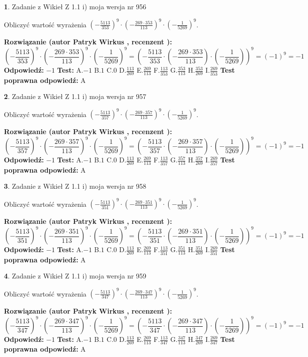 \documentclass[12pt, a4paper]{article}
\theoremstyle{definition} %
\newtheorem{zad}{}
\newcommand{\zadStart}[1]{\begin{zad}#1\newline}
\newcommand{\zadStop}{\end{zad}}
\newcommand{\rozwStart}[2]{\noindent \textbf{Rozwiązanie (autor #1 , recenzent #2): }\newline}
\newcommand{\rozwStop}{\newline}
\newcommand{\odpStart}{\noindent \textbf{Odpowiedź:}\newline}
\newcommand{\odpStop}{\newline}
\newcommand{\testStart}{\noindent \textbf{Test:}\newline}
\newcommand{\testStop}{\newline}
\newcommand{\kluczStart}{\noindent \textbf{Test poprawna odpowiedź:}\newline}
\newcommand{\kluczStop}{\newline}
\begin{document}
\zadStart{Zadanie z Wikieł Z 1.1 i) moja wersja nr 956}

Obliczyć wartość wyrażenia $(-\frac{5113}{353})^{9} \cdot (-\frac{269 \cdot 353}{113})^{9} \cdot (-\frac{1}{5269})^{9}$.
\zadStop
\rozwStart{Patryk Wirkus}{}
$$(-\frac{5113}{353})^{9} \cdot (-\frac{269 \cdot 353}{113})^{9} \cdot (-\frac{1}{5269})^{9} = (-\frac{5113}{353} \cdot (-\frac{269 \cdot 353}{113}) \cdot (-\frac{1}{5269}))^{9} = (-1)^{9} = -1$$
\rozwStop
\odpStart
$-1$
\odpStop
\testStart
A.$-1$ B.$1$ C.$0$ D.$\frac{113}{269}$ E.$\frac{269}{113}$
F.$\frac{113}{353}$ G.$\frac{353}{113}$
H.$\frac{353}{269}$
I.$\frac{269}{353}$
\testStop
\kluczStart
A
\kluczStop



\zadStart{Zadanie z Wikieł Z 1.1 i) moja wersja nr 957}

Obliczyć wartość wyrażenia $(-\frac{5113}{357})^{9} \cdot (-\frac{269 \cdot 357}{113})^{9} \cdot (-\frac{1}{5269})^{9}$.
\zadStop
\rozwStart{Patryk Wirkus}{}
$$(-\frac{5113}{357})^{9} \cdot (-\frac{269 \cdot 357}{113})^{9} \cdot (-\frac{1}{5269})^{9} = (-\frac{5113}{357} \cdot (-\frac{269 \cdot 357}{113}) \cdot (-\frac{1}{5269}))^{9} = (-1)^{9} = -1$$
\rozwStop
\odpStart
$-1$
\odpStop
\testStart
A.$-1$ B.$1$ C.$0$ D.$\frac{113}{269}$ E.$\frac{269}{113}$
F.$\frac{113}{357}$ G.$\frac{357}{113}$
H.$\frac{357}{269}$
I.$\frac{269}{357}$
\testStop
\kluczStart
A
\kluczStop



\zadStart{Zadanie z Wikieł Z 1.1 i) moja wersja nr 958}

Obliczyć wartość wyrażenia $(-\frac{5113}{351})^{9} \cdot (-\frac{269 \cdot 351}{113})^{9} \cdot (-\frac{1}{5269})^{9}$.
\zadStop
\rozwStart{Patryk Wirkus}{}
$$(-\frac{5113}{351})^{9} \cdot (-\frac{269 \cdot 351}{113})^{9} \cdot (-\frac{1}{5269})^{9} = (-\frac{5113}{351} \cdot (-\frac{269 \cdot 351}{113}) \cdot (-\frac{1}{5269}))^{9} = (-1)^{9} = -1$$
\rozwStop
\odpStart
$-1$
\odpStop
\testStart
A.$-1$ B.$1$ C.$0$ D.$\frac{113}{269}$ E.$\frac{269}{113}$
F.$\frac{113}{351}$ G.$\frac{351}{113}$
H.$\frac{351}{269}$
I.$\frac{269}{351}$
\testStop
\kluczStart
A
\kluczStop



\zadStart{Zadanie z Wikieł Z 1.1 i) moja wersja nr 959}

Obliczyć wartość wyrażenia $(-\frac{5113}{347})^{9} \cdot (-\frac{269 \cdot 347}{113})^{9} \cdot (-\frac{1}{5269})^{9}$.
\zadStop
\rozwStart{Patryk Wirkus}{}
$$(-\frac{5113}{347})^{9} \cdot (-\frac{269 \cdot 347}{113})^{9} \cdot (-\frac{1}{5269})^{9} = (-\frac{5113}{347} \cdot (-\frac{269 \cdot 347}{113}) \cdot (-\frac{1}{5269}))^{9} = (-1)^{9} = -1$$
\rozwStop
\odpStart
$-1$
\odpStop
\testStart
A.$-1$ B.$1$ C.$0$ D.$\frac{113}{269}$ E.$\frac{269}{113}$
F.$\frac{113}{347}$ G.$\frac{347}{113}$
H.$\frac{347}{269}$
I.$\frac{269}{347}$
\testStop
\kluczStart
A
\kluczStop
\end{document}
